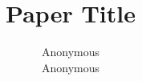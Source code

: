 

    \date{}

    \title{\Large \bf Paper Title}

    \author{
            {\rm Anonymous }\\
        Anonymous
    } %

    \maketitle

    

    
    
    
    
    
    
    
    

    
    

    \appendix
    



